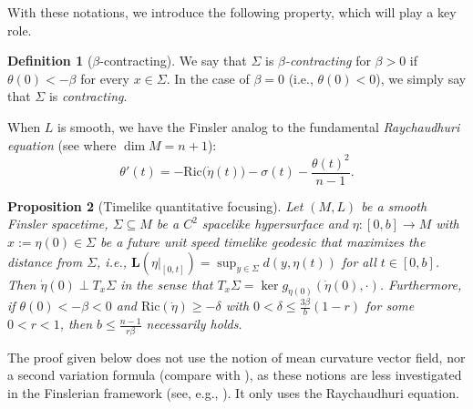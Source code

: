 \documentclass[a4paper,11pt]{article}
\numberwithin{equation}{section}
\theoremstyle{definition}
\newtheorem{Definition}{Definition}[section]
\theoremstyle{plain}
\newtheorem{Proposition}[Definition]{Proposition}
\newcommand{\Ric}{\mathrm{Ric}}
\begin{document}
With these notations, we introduce the following property, which will play a key role.

\begin{Definition}[$\beta$-contracting]\label{df:beta}
We say that $\Sigma$ is \emph{$\beta$-contracting} for $\beta>0$ if $\theta(0)<-\beta$ for every $x \in \Sigma$. 
In the case of $\beta=0$ (i.e., $\theta(0)<0$), we simply say that $\Sigma$ is \emph{contracting}.
\end{Definition}

When $L$ is smooth, we have the Finsler analog to the fundamental \emph{Raychaudhuri equation} (see \cite[Eq.\ (25)]{MinguzziRaychaudhuri} where $\dim M=n+1$): 
\begin{equation}\label{eq:Ray}
\theta'(t) =-\Ric\bigl( \dot{\eta}(t) \bigr) -\sigma(t) -\frac{\theta(t)^2}{n-1}.
\end{equation}

\begin{Proposition}[Timelike quantitative focusing]
\label{Prop: Hawking quantitative focusing}
Let $(M,L)$ be a smooth Finsler spacetime, $\Sigma \subseteq M$ be a $C^2$ spacelike hypersurface and $\eta : [0, b] \to M$ with
$x := \eta(0) \in \Sigma$  be a future unit speed timelike geodesic that maximizes the
distance from $\Sigma$, i.e., $\mathbf{L}(\eta\vert_{[0,t]}) = \sup_{y\in \Sigma} d(y,\eta(t))$ for all $t \in [0, b]$. 
Then $\dot{\eta}(0) \perp T_x\Sigma$ in the sense that $T_x\Sigma=\ker g_{\dot \eta(0)}(\dot \eta(0), \cdot)$. 
Furthermore, if $\theta(0)<-\beta<0$
and $\Ric(\dot{\eta}) \ge -\delta$ with $0 < \delta \le \frac{3\beta}{b} (1-r)$ for some
$0 < r < 1$, then $b \le\frac{n-1}{r\beta}$ necessarily holds.
\end{Proposition}

The proof given below does not use the notion of mean curvature vector field, nor a second variation formula (compare with \cite[Lem.\ 4.10]{Graf-SingularityC1}), as these notions are less investigated in the Finslerian framework (see, e.g., \cite{Shlec}). 
It only uses the Raychaudhuri equation.
\end{document}
